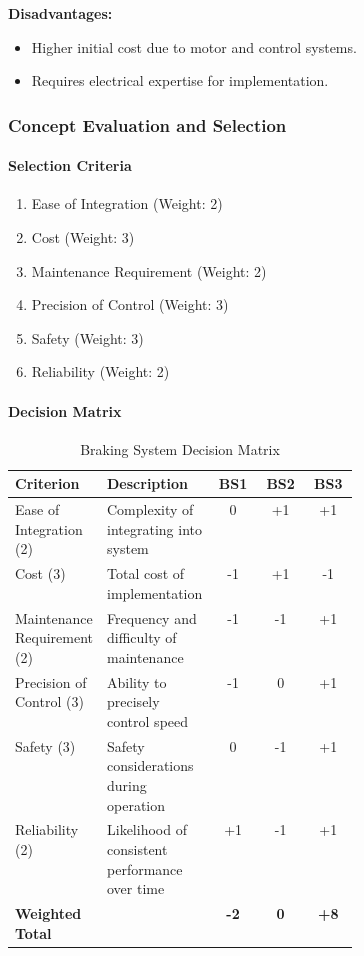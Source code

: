 \textbf{Disadvantages:}
\begin{itemize}
    \item Higher initial cost due to motor and control systems.
    \item Requires electrical expertise for implementation.
\end{itemize}

\subsubsection{Concept Evaluation and Selection}

\paragraph{Selection Criteria}

\begin{enumerate}
    \item Ease of Integration (Weight: 2)
    \item Cost (Weight: 3)
    \item Maintenance Requirement (Weight: 2)
    \item Precision of Control (Weight: 3)
    \item Safety (Weight: 3)
    \item Reliability (Weight: 2)
\end{enumerate}

\paragraph{Decision Matrix}

\begin{table}[H]
\centering
\caption{Braking System Decision Matrix}
\label{tab:bs_decision_matrix}
\begin{tabular}{|p{0.1\linewidth}|p{0.3\linewidth}|c|c|c|}
\hline
\textbf{Criterion} & \textbf{Description} & \textbf{BS1} & \textbf{BS2} & \textbf{BS3} \\
\hline
Ease of Integration (2) & Complexity of integrating into system & 0 & +1 & +1 \\
\hline
Cost (3) & Total cost of implementation & -1 & +1 & -1 \\
\hline
Maintenance Requirement (2) & Frequency and difficulty of maintenance & -1 & -1 & +1 \\
\hline
Precision of Control (3) & Ability to precisely control speed & -1 & 0 & +1 \\
\hline
Safety (3) & Safety considerations during operation & 0 & -1 & +1 \\
\hline
Reliability (2) & Likelihood of consistent performance over time & +1 & -1 & +1 \\
\hline
\textbf{Weighted Total} &  & \textbf{-2} & \textbf{0} & \textbf{+8} \\
\hline
\end{tabular}
\end{table}

